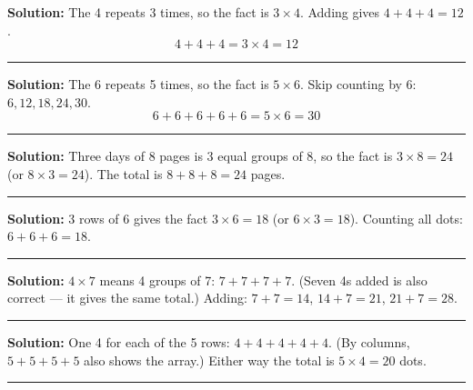\documentclass[12pt]{article}
\begin{document}



\textbf{Solution:} The 4 repeats 3 times, so the fact is $3 \times 4$. Adding gives $4 + 4 + 4 = 12$.
\[ \boxed{4 + 4 + 4 = 3 \times 4 = 12} \]

\noindent\rule{\linewidth}{0.2pt}


\textbf{Solution:} The 6 repeats 5 times, so the fact is $5 \times 6$. Skip counting by 6: $6, 12, 18, 24, 30$.
\[ \boxed{6 + 6 + 6 + 6 + 6 = 5 \times 6 = 30} \]

\noindent\rule{\linewidth}{0.2pt}


\textbf{Solution:} Three days of 8 pages is 3 equal groups of 8, so the fact is $3 \times 8 = 24$ (or $8 \times 3 = 24$). The total is $8 + 8 + 8 = 24$ pages. 

\noindent\rule{\linewidth}{0.2pt}


\textbf{Solution:} 3 rows of 6 gives the fact $3 \times 6 = 18$ (or $6 \times 3 = 18$). Counting all dots: $6 + 6 + 6 = 18$. 

\noindent\rule{\linewidth}{0.2pt}


\textbf{Solution:} $4 \times 7$ means 4 groups of 7: $7 + 7 + 7 + 7$. (Seven 4s added is also correct --- it gives the same total.) Adding: $7 + 7 = 14$, $14 + 7 = 21$, $21 + 7 = 28$. 

\noindent\rule{\linewidth}{0.2pt}


\textbf{Solution:} One 4 for each of the 5 rows: $4 + 4 + 4 + 4 + 4$. (By columns, $5 + 5 + 5 + 5$ also shows the array.) Either way the total is $5 \times 4 = 20$ dots. 

\noindent\rule{\linewidth}{0.2pt}

\end{document}
